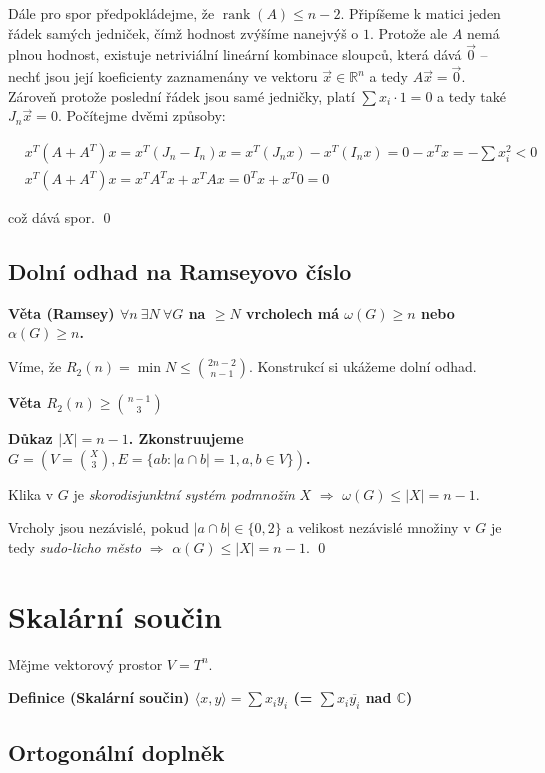 \documentclass[a4paper,12pt,titlepage]{article}
\newcommand{\dk}{\smallskip\noindent\bf Důkaz\rm{} }
\newcommand{\df}{\smallskip\noindent\bf Definice\rm{} }
\newcommand{\vt}{\smallskip\noindent\bf Věta\rm{} }
\newcommand{\C}{\mathbb{C}}
\newcommand{\R}{\mathbb{R}}
\DeclareMathOperator{\rank}{rank}
\newcommand{\sk}[1]{{\langle #1\rangle}}
\begin{document}
Dále pro spor předpokládejme, že $\rank(A) \leq n-2$. Připíšeme k matici jeden 
řádek samých jedniček, čímž hodnost zvýšíme nanejvýš o $1$. Protože ale $A$ nemá 
plnou hodnost, existuje netriviální lineární kombinace sloupců, která dává 
$\vec{0}$ -- nechť jsou její koeficienty zaznamenány ve vektoru $\vec{x} \in 
\R^n$ a tedy $A\vec{x}=\vec{0}$. Zároveň protože poslední řádek jsou samé 
jedničky, platí $\sum x_i \cdot 1 = 0$ a tedy také $J_n\vec{x} = 0$. Počítejme 
dvěmi způsoby:

\begin{align}
	&x^T(A + A^T) x = x^T(J_n - I_n)x = x^T(J_nx) - x^T(I_nx) = 0 - x^T x = - 
	\sum x_i^2 < 0 \\
	&x^T(A+A^T) x = x^TA^Tx + x^TAx = 0^Tx + x^T0 = 0
\end{align}

což dává spor. \qed

\subsection{Dolní odhad na Ramseyovo číslo}
\vt (Ramsey) $\forall n\ \exists N\ \forall G$ na $\ge N$ vrcholech má $\omega(G) \ge n$ nebo $\alpha(G) \ge n$.

Víme, že $R_2(n) = \min N \le {2n-2\choose n-1}$. Konstrukcí si ukážeme dolní odhad.

\vt $R_2(n) \ge {n-1\choose 3}$

\dk $|X| = n-1$. Zkonstruujeme $G=\left(V={X\choose 3}, E=\{ab: |a\cap b|=1, a,b\in V\}\right)$.

Klika v $G$ je {\it skorodisjunktní systém podmnožin} $X$ $\Rightarrow$ $\omega(G) \le |X| = n-1$.

Vrcholy jsou nezávislé, pokud $|a\cap b| \in \{0,2\}$ a velikost nezávislé množiny 
v $G$ je tedy {\it sudo-licho město} $\Rightarrow$ $\alpha(G) \le |X| = n-1$.
\qed

\section{Skalární součin}

Mějme vektorový prostor $V = T^n$.

\df (Skalární součin) $\sk{x,y} = \sum x_iy_i$ \quad(= $\sum x_i\overline{y_i}$ nad $\C$)

\subsection{Ortogonální doplněk}
\end{document}

